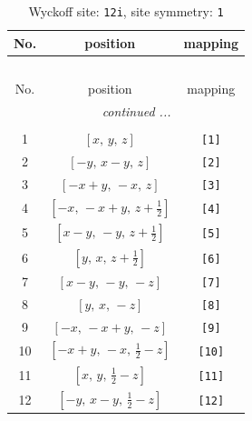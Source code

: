 \documentclass[fleqn,8pt]{jsarticle}
\begin{document}
\renewcommand{\arraystretch}{1.2}
\begin{longtable}{ccc}
\caption{Wyckoff site: {\tt 12i}, site symmetry: {\tt 1}}
 \\
 \hline \hline
No. & position & mapping \\ \hline \endfirsthead

\multicolumn{2}{l}{\tablename\ \thetable{}} \\
 \hline \hline
No. & position & mapping \\ \hline \endhead

 \hline \hline
\multicolumn{2}{r}{\footnotesize\it continued ...} \\ \endfoot

 \hline \hline
\multicolumn{2}{r}{} \\ \endlastfoot

1 & $\left[ x,\, y,\, z \right]$ & {\tt [1]} \\ \hline
2 & $\left[ - y,\, x - y,\, z \right]$ & {\tt [2]} \\ \hline
3 & $\left[ - x + y,\, - x,\, z \right]$ & {\tt [3]} \\ \hline
4 & $\left[ - x,\, - x + y,\, z + \frac{1}{2} \right]$ & {\tt [4]} \\ \hline
5 & $\left[ x - y,\, - y,\, z + \frac{1}{2} \right]$ & {\tt [5]} \\ \hline
6 & $\left[ y,\, x,\, z + \frac{1}{2} \right]$ & {\tt [6]} \\ \hline
7 & $\left[ x - y,\, - y,\, - z \right]$ & {\tt [7]} \\ \hline
8 & $\left[ y,\, x,\, - z \right]$ & {\tt [8]} \\ \hline
9 & $\left[ - x,\, - x + y,\, - z \right]$ & {\tt [9]} \\ \hline
10 & $\left[ - x + y,\, - x,\, \frac{1}{2} - z \right]$ & {\tt [10]} \\ \hline
11 & $\left[ x,\, y,\, \frac{1}{2} - z \right]$ & {\tt [11]} \\ \hline
12 & $\left[ - y,\, x - y,\, \frac{1}{2} - z \right]$ & {\tt [12]} \\
\end{longtable}
\end{document}
